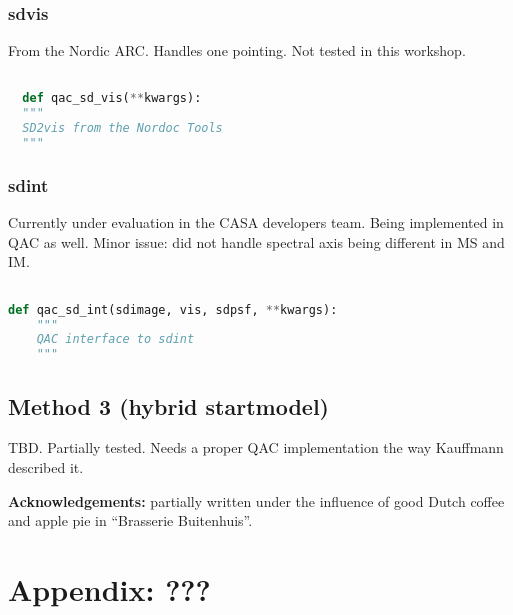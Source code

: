 \documentclass[12pt,a4paper]{article}
\begin{document}
\subsubsection{sdvis}

From the Nordic ARC. Handles one pointing. Not tested in this workshop.

\begin{lstlisting}[language=Python]

  def qac_sd_vis(**kwargs):
  """
  SD2vis from the Nordoc Tools
  """

\end{lstlisting}


\subsubsection{sdint}

Currently under evaluation in the CASA developers team.  Being implemented in QAC as well.
Minor issue: did not handle spectral axis being different in MS and IM.

\begin{lstlisting}[language=Python]

def qac_sd_int(sdimage, vis, sdpsf, **kwargs):
    """
    QAC interface to sdint
    """


\end{lstlisting}


\subsection{Method 3 (hybrid startmodel)}

TBD. Partially tested. Needs a proper QAC implementation the way Kauffmann described it.

\bigskip
{\bf Acknowledgements:} partially written under the influence of good Dutch coffee and apple pie in ``Brasserie Buitenhuis''.

\clearpage
\section{Appendix: ???}

\begin{lstlisting}[language=Python]

\end{lstlisting}
\end{document}
